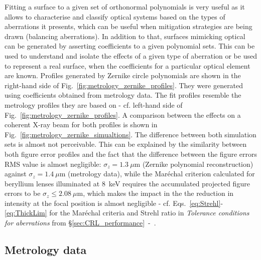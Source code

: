 \begin{refsection}
Fitting a surface to a given set of orthonormal polynomials is very useful as it allows to characterise and classify optical systems based on the types of aberrations it presents, which can be useful when mitigation strategies are being drawn (balancing aberrations). In addition to that, surfaces mimicking optical can be generated by asserting coefficients to a given polynomial sets. This can be used to understand and isolate the effects of a given type of aberration or be used to represent a real surface, when the coefficients for a particular optical element are known. Profiles generated by Zernike circle polynomials are shown in the right-hand side of Fig.~\ref{fig:metrology_zernike_profiles}. They were generated using coefficients obtained from metrology data. The fit profiles resemble the metrology profiles they are based on - cf. left-hand side of Fig.~\ref{fig:metrology_zernike_profiles}. A comparison between the effects on a coherent X-ray beam for both profiles is shown in Fig.~\ref{fig:metrology_zernike_simualtions}. The difference between both simulation sets is almost not perceivable. This can be explained by the similarity between both figure error profiles and the fact that the difference between the figure errors RMS value is almost negligible: $\sigma_z=1.3~\mu$m (Zernike polynomial reconstruction) against $\sigma_z=1.4~\mu$m (metrology data), while the Mar\'echal criterion calculated for beryllium lenses illuminated at $8$~keV requires the accumulated projected figure errors to be $\sigma_z\leq2.08~\mu$m, which makes the impact in the the reduction in intensity at the focal position is almost negligible - cf. Eqs.~\ref{eq:Strehl}-\ref{eq:ThickLim} for the Mar\'echal criteria and Strehl ratio in \textit{Tolerance conditions for aberrations} from \S\ref{sec:CRL_performance}~-~\textit{}.

\subsection{Metrology data}\label{sec:metrology_data}


\end{refsection}
